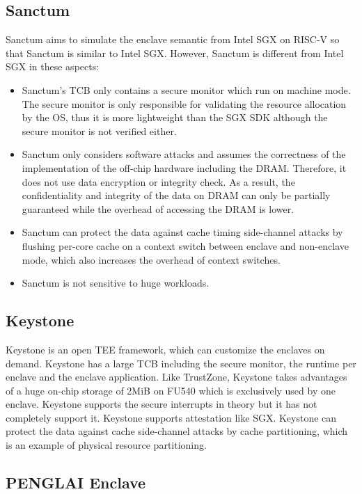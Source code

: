 \documentclass[12pt,twoside]{report}
\begin{document}
\subsection{Sanctum}

Sanctum\cite{costan2016sanctum} aims to simulate the enclave semantic from Intel SGX on RISC-V so that Sanctum is similar to Intel SGX. However, Sanctum is different from Intel SGX in these aspects:

\begin{itemize}
    \item Sanctum's TCB only contains a secure monitor which run on machine mode. The secure monitor is only responsible for validating the resource allocation by the OS, thus it is more lightweight than the SGX SDK although the secure monitor is not verified either.
    \item Sanctum only considers software attacks and assumes the correctness of the implementation of the off-chip hardware including the DRAM. Therefore, it does not use data encryption or integrity check. As a result, the confidentiality and integrity of the data on DRAM can only be partially guaranteed while the overhead of accessing the DRAM is lower.
    \item Sanctum can protect the data against cache timing side-channel attacks by flushing per-core cache on a context switch between enclave and non-enclave mode, which also increases the overhead of context switches.
    \item Sanctum is not sensitive to huge workloads.
\end{itemize}

\subsection{Keystone}

Keystone\cite{lee2020keystone} is an open TEE framework, which can customize the enclaves on demand. Keystone has a large TCB including the secure monitor, the runtime per enclave and the enclave application. Like TrustZone, Keystone takes advantages of a huge on-chip storage of 2MiB on FU540 which is exclusively used by one enclave. Keystone supports the secure interrupts in theory but it has not completely support it. Keystone supports attestation like SGX. Keystone can protect the data against cache side-channel attacks by cache partitioning, which is an example of physical resource partitioning.

\subsection{PENGLAI Enclave}
\end{document}
